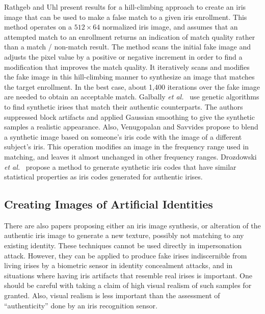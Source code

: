\documentclass[format=acmsmall, review=false, timestamp=false]{acmart}
\newcommand{\etal}{{\it et al.}~}
\begin{document}
Rathgeb and Uhl \cite{Rathgeb_ICPR_2010} present results for a hill-climbing approach to creat{e} an iris image that can be used to make a false match to a given iris enrollment. This method operates on a $512\times64$ normalized iris image, and assumes that an attempted match to an enrollment returns an indication of match quality rather than a match / non-match result. The method scans the initial {fake} image and adjusts the pixel value by a positive or negative increment in order to find a modification that improves the match quality. It iteratively scans and modifies the {fake} image in this hill-climbing manner to synthesize an image that matches the target enrollment. In the best case, about 1,400 iterations over the {fake} image are needed to obtain an acceptable match. Galbally \etal \cite{Galbally_CVIU_2013} use genetic algorithms to find synthetic irises that match their authentic counterparts. The authors suppressed block artifacts and applied Gaussian smoothing to give the synthetic samples a realistic appearance. Also, Venugopalan and Savvides \cite{Venugopalan_TIFS_2011} propose to blend a synthetic image based on someone's iris code with the image of a different subject's iris. This operation modifies an image in the frequency range used in matching, and leaves it almost unchanged in other frequency ranges. {Drozdowski \etal \cite{Drozdowski_BIOSIG_2017} propose a method to generate synthetic iris codes that have similar statistical properties as iris codes generated for authentic irises.}


\subsection{Creating Images of Artificial Identities}
\label{sec:KnownVulnerabilities_Samples_NonMatching}

There are also papers proposing either an iris image synthesis, or alteration of the authentic iris image to generate a new texture, possibly not matching to any existing identity. These techniques cannot be used directly in impersonation attack. However, they can be applied to produce fake irises indiscernible from living irises by a biometric sensor in identity concealment attacks, and in situations where having iris artifacts that resemble real irises is important. One should be careful with taking a claim of high visual realism of such samples for granted{.} {Also, visual realism} is less important than the assessment of ``authenticity'' done by an iris recognition sensor.
\end{document}
